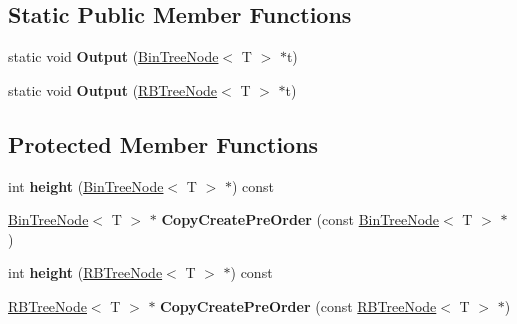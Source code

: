 \subsection*{Static Public Member Functions}
\begin{DoxyCompactItemize}
\item 
\mbox{\label{classLinkedBinaryTree_a6ea270a1d0306d6b7b1706dc1b667541}} 
static void {\bfseries Output} (\hyperlink{structBinTreeNode}{Bin\+Tree\+Node}$<$ T $>$ $\ast$t)
\item 
\mbox{\label{classLinkedBinaryTree_a3773993f439ae092fcd084decfb6f652}} 
static void {\bfseries Output} (\hyperlink{structRBTreeNode}{R\+B\+Tree\+Node}$<$ T $>$ $\ast$t)
\end{DoxyCompactItemize}
\subsection*{Protected Member Functions}
\begin{DoxyCompactItemize}
\item 
\mbox{\label{classLinkedBinaryTree_afc338c654fefdada8ea2f83b5eeb59d0}} 
int {\bfseries height} (\hyperlink{structBinTreeNode}{Bin\+Tree\+Node}$<$ T $>$ $\ast$) const
\item 
\mbox{\label{classLinkedBinaryTree_a846965fd49048760c3e48e78f456eb47}} 
\hyperlink{structBinTreeNode}{Bin\+Tree\+Node}$<$ T $>$ $\ast$ {\bfseries Copy\+Create\+Pre\+Order} (const \hyperlink{structBinTreeNode}{Bin\+Tree\+Node}$<$ T $>$ $\ast$)
\item 
\mbox{\label{classLinkedBinaryTree_adeb196927e3e6f99061ed50bedbe4643}} 
int {\bfseries height} (\hyperlink{structRBTreeNode}{R\+B\+Tree\+Node}$<$ T $>$ $\ast$) const
\item 
\mbox{\label{classLinkedBinaryTree_a7e04c9e2d58e7a799be68df531e3e3e1}} 
\hyperlink{structRBTreeNode}{R\+B\+Tree\+Node}$<$ T $>$ $\ast$ {\bfseries Copy\+Create\+Pre\+Order} (const \hyperlink{structRBTreeNode}{R\+B\+Tree\+Node}$<$ T $>$ $\ast$)
\end{DoxyCompactItemize}
